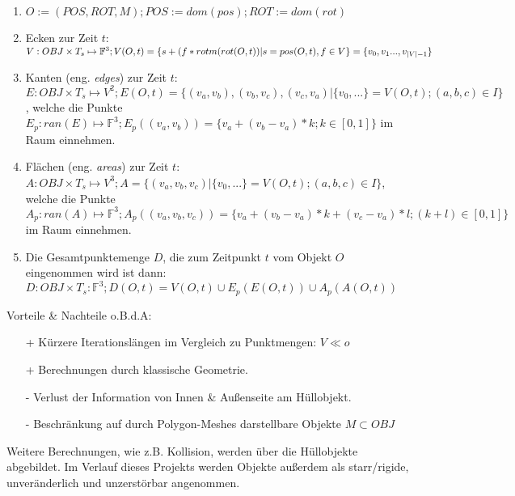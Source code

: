\begin{enumerate}
\item $ O:=(POS, ROT, M); POS:= dom(pos); ROT:=dom(rot) $
\item Ecken zur Zeit $t$: $V:OBJ\times T_s\mapsto\mathbb{F}^3; V(O, t) = \{s + (f * rotm(rot(O, t))\\ | s = pos(O, t), f\in V\} = \{v_0, v_1 ... , v_{|V|-1}\}$
\item Kanten (eng. \textit{edges}) zur Zeit $t$: $ E:OBJ\times T_s\mapsto V^2; E(O, t) = \{(v_a, v_b), (v_b, v_c),(v_c, v_a) | \{v_0, ...\} = V(O, t);(a, b, c) \in I\} $\\
, welche die Punkte $E_p:ran(E)\mapsto\mathbb{F}^3; E_p((v_a, v_b)) = \{v_a + (v_b-v_a)* k; k \in [0,1]\} $ im Raum einnehmen.
\item Flächen (eng. \textit{areas}) zur Zeit $t$: $ A:OBJ\times T_s\mapsto V^3; A = \{(v_a, v_b, v_c) | \{v_0, ... \} = V(O, t); (a, b, c) \in I\} $,\\
welche die Punkte $A_p:ran(A)\mapsto\mathbb{F}^3; A_p((v_a, v_b, v_c)) = \{v_a + (v_b-v_a)* k + (v_c-v_a)*l; (k+l) \in [0,1]\} $ im Raum einnehmen.
\item Die Gesamtpunktemenge $D$, die zum Zeitpunkt $t$ vom Objekt $O$ eingenommen wird ist dann:
$ D: OBJ\times T_s: \mathbb{F}^3; D(O, t) = V(O, t)\cup E_p(E(O, t)) \cup A_p(A(O, t))$
\end{enumerate}

Vorteile \& Nachteile o.B.d.A:
\begin{itemize}
\item [+]Kürzere Iterationslängen im Vergleich zu Punktmengen: $V\ll o$
\item [+]Berechnungen durch klassische Geometrie.
\item [-]Verlust der Information von Innen \& Außenseite am Hüllobjekt.
\item [-]Beschränkung auf durch Polygon-Meshes darstellbare Objekte $M\subset OBJ$
\end{itemize}

Weitere Berechnungen, wie z.B. Kollision, werden über die Hüllobjekte abgebildet.
Im Verlauf dieses Projekts werden Objekte außerdem als starr/rigide, unveränderlich und unzerstörbar angenommen.

